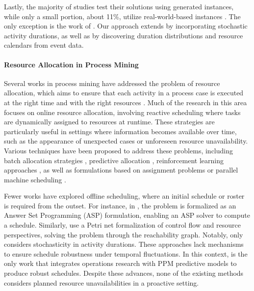 Lastly,  the majority of studies test their solutions using generated instances, while only a small portion, about 11\%, utilize real-world-based instances \cite{sanchez2023survey}. 
The only exception is the work of \cite{senderovich2019learning}.
Our approach extends \cite{senderovich2019learning} by incorporating stochastic activity
durations, as well as by discovering duration distributions and resource calendars from event data. 

\paragraph{Resource Allocation in Process Mining}

Several works in process mining have addressed the problem of resource allocation, which aims to ensure that each activity in a process case is executed at the right time and with the right resources \cite{Kumar_2002}.
Much of the research in this area focuses on online resource allocation, involving reactive scheduling where tasks are dynamically assigned to resources at runtime. These strategies are particularly useful in settings where information becomes available over time, such as the appearance of unexpected cases or unforeseen resource unavailability. Various techniques have been proposed to address these problems, including batch allocation strategies \cite{Delias_2011,Arias2018HumanRA,Zeng_2005}, predictive allocation \cite{Park_2019}, reinforcement learning approaches \cite{HUANG2011127,Zbikowski_2023,MIDDELHUIS2025102492,BEEREPOOT2023103837,Meneghello_2024}, as well as formulations based on assignment problems or parallel machine scheduling \cite{Kunkler_2024}.

Fewer works have explored offline scheduling, where an initial schedule or roster is required from the outset. For instance, in \cite{Havur_2022}, the problem is formalized as an Answer Set Programming (ASP) formulation, enabling an ASP solver to compute a schedule. Similarly, \cite{Aalst_1996,DOERNER20061798} use a Petri net formalization of control flow and resource perspectives, solving the problem through the reachability graph. Notably, only \cite{DOERNER20061798} considers stochasticity in activity durations. These approaches lack mechanisms to ensure schedule robustness under temporal fluctuations. In this context, \cite{DiCunzolo_2024} is the only work that integrates operations research with PPM predictive models to produce robust schedules.
Despite these advances, none of the existing methods considers planned resource unavailabilities in a proactive setting.





